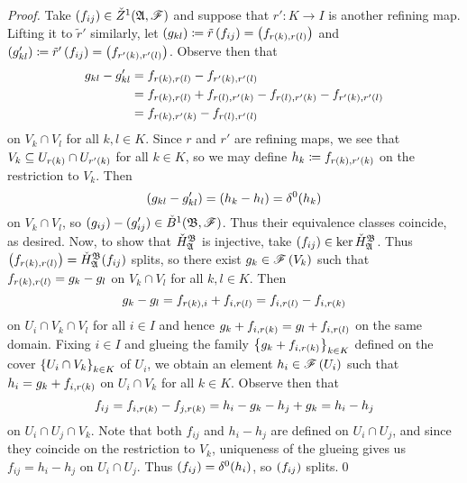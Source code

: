 \documentclass[../Moduli_Spaces_of_Riemann_Surfaces.tex]{subfiles}
\begin{document}
    \begin{proof}
        Take $\left(f_{ij}\right)\in\check{Z}^1\!\left(\mathfrak{A},\mathscr{F}\right)$ and suppose that $r':K\to I$ is another refining map. Lifting it to $\tilde{r}'$ similarly, let $\left(g_{kl}\right)\coloneqq\tilde{r}\left(f_{ij}\right)=\left(f_{r\left(k\right),r\left(l\right)}\right)$ and $(g'_{kl})\coloneqq\tilde{r}'\left(f_{ij}\right)=\left(f_{r'\left(k\right),r'\left(l\right)}\right)$. Observe then that
        \begin{equation*}
            \begin{aligned}
                g_{kl}-g_{kl}'&=f_{r\left(k\right),r\left(l\right)}-f_{r'\left(k\right),r'\left(l\right)} \\
                              &=f_{r\left(k\right),r\left(l\right)}+f_{r\left(l\right),r'\left(k\right)}-f_{r\left(l\right),r'\left(k\right)}-f_{r'\left(k\right),r'\left(l\right)} \\
                              &=f_{r\left(k\right),r'\left(k\right)}-f_{r\left(l\right),r'\left(l\right)}
            \end{aligned}
        \end{equation*}
        on $V_k\cap V_l$ for all $k,l\in K$. Since $r$ and $r'$ are refining maps, we see that $V_k\subseteq U_{r\left(k\right)}\cap U_{r'\left(k\right)}$ for all $k\in K$, so we may define $h_k\coloneqq f_{r\left(k\right),r'\left(k\right)}$ on the restriction to $V_k$. Then
        \begin{equation*}
            \left(g_{kl}-g_{kl}'\right)=\left(h_k-h_l\right)=\delta^0\!\left(h_k\right)
        \end{equation*}
        on $V_k\cap V_l$, so $\left(g_{ij}\right)-(g_{ij}')\in\check{B}^1\!\left(\mathfrak{B},\mathscr{F}\right)$. Thus their equivalence classes coincide, as desired. Now, to show that $\check{H}_{\mathfrak{A}}^{\mathfrak{B}}$ is injective, take $\left(f_{ij}\right)\in\ker\check{H}_{\mathfrak{A}}^{\mathfrak{B}}$. Thus $\left(f_{r\left(k\right),r\left(l\right)}\right)=\check{H}_{\mathfrak{A}}^{\mathfrak{B}}\!\left(f_{ij}\right)$ splits, so there exist $g_k\in\mathscr{F}\left(V_k\right)$ such that $f_{r\left(k\right),r\left(l\right)}=g_k-g_l$ on $V_k\cap V_l$ for all $k,l\in K$. Then
        \begin{equation*}
            g_k-g_l=f_{r\left(k\right),i}+f_{i,r\left(l\right)}=f_{i,r\left(l\right)}-f_{i,r\left(k\right)}
        \end{equation*}
        on $U_i\cap V_k\cap V_l$ for all $i\in I$ and hence $g_k+f_{i,r\left(k\right)}=g_l+f_{i,r\left(l\right)}$ on the same domain. Fixing $i\in I$ and glueing the family $\left\{g_k+f_{i,r\left(k\right)}\right\}_{k\in K}$ defined on the cover $\left\{U_i\cap V_k\right\}_{k\in K}$ of $U_i$, we obtain an element $h_i\in\mathscr{F}\left(U_i\right)$ such that $h_i=g_k+f_{i,r\left(k\right)}$ on $U_i\cap V_k$ for all $k\in K$. Observe then that
        \begin{equation*}
            f_{ij}=f_{i,r\left(k\right)}-f_{j,r\left(k\right)}=h_i-g_k-h_j+g_k=h_i-h_j
        \end{equation*}
        on $U_i\cap U_j\cap V_k$. Note that both $f_{ij}$ and $h_i-h_j$ are defined on $U_i\cap U_j$, and since they coincide on the restriction to $V_k$, uniqueness of the glueing gives us $f_{ij}=h_i-h_j$ on $U_i\cap U_j$. Thus $\left(f_{ij}\right)=\delta^0\!\left(h_i\right)$, so $\left(f_{ij}\right)$ splits.\qed
    \end{proof}
\end{document}
